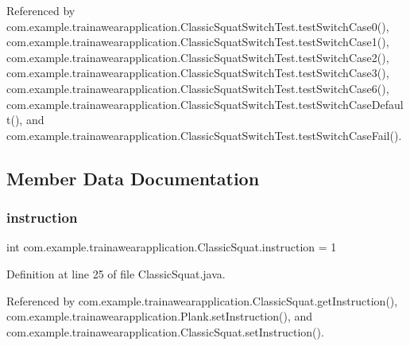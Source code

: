 Referenced by com.\+example.\+trainawearapplication.\+Classic\+Squat\+Switch\+Test.\+test\+Switch\+Case0(), com.\+example.\+trainawearapplication.\+Classic\+Squat\+Switch\+Test.\+test\+Switch\+Case1(), com.\+example.\+trainawearapplication.\+Classic\+Squat\+Switch\+Test.\+test\+Switch\+Case2(), com.\+example.\+trainawearapplication.\+Classic\+Squat\+Switch\+Test.\+test\+Switch\+Case3(), com.\+example.\+trainawearapplication.\+Classic\+Squat\+Switch\+Test.\+test\+Switch\+Case6(), com.\+example.\+trainawearapplication.\+Classic\+Squat\+Switch\+Test.\+test\+Switch\+Case\+Default(), and com.\+example.\+trainawearapplication.\+Classic\+Squat\+Switch\+Test.\+test\+Switch\+Case\+Fail().



\subsection{Member Data Documentation}
\mbox{\label{classcom_1_1example_1_1trainawearapplication_1_1_classic_squat_a3cbf1db0a5560d931ebdaa407a1a6285}} 
\subsubsection{\texorpdfstring{instruction}{instruction}}
{\footnotesize\ttfamily int com.\+example.\+trainawearapplication.\+Classic\+Squat.\+instruction = 1\hspace{0.3cm}{\ttfamily [static]}}



Definition at line 25 of file Classic\+Squat.\+java.



Referenced by com.\+example.\+trainawearapplication.\+Classic\+Squat.\+get\+Instruction(), com.\+example.\+trainawearapplication.\+Plank.\+set\+Instruction(), and com.\+example.\+trainawearapplication.\+Classic\+Squat.\+set\+Instruction().

\mbox{\label{classcom_1_1example_1_1trainawearapplication_1_1_classic_squat_a28250169a237362b6ab0a7412cd12da6}} 
